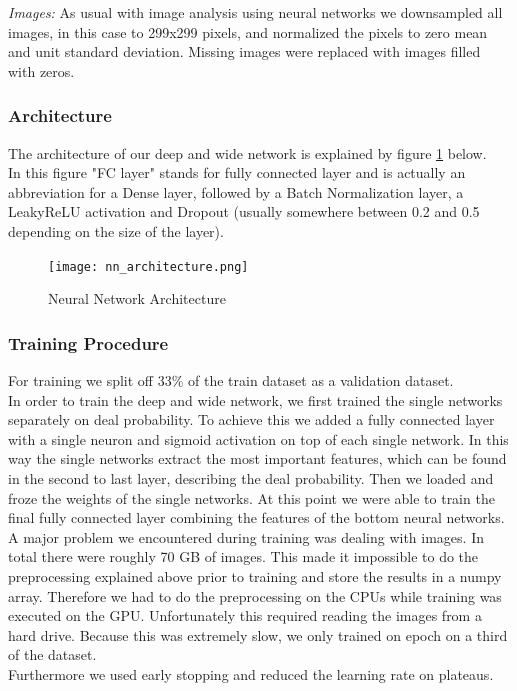 \documentclass[runningheads]{llncs}
\begin{document}
 \textit{Images:} As usual with image analysis using neural networks we downsampled all images, in this case to 299x299 pixels, and normalized the pixels to zero mean and unit standard deviation. Missing images were replaced with images filled with zeros. \\
 
 \subsubsection{Architecture}
The architecture of our deep and wide network is explained by figure \ref{fig:architecture} below.\\
In this figure "FC layer" stands for fully connected layer and is actually an abbreviation for a Dense layer, followed by a Batch Normalization layer, a LeakyReLU activation and Dropout (usually somewhere between 0.2 and 0.5 depending on the size of the layer).
 
\begin{figure}
	\centering
	\texttt{[image: nn\_architecture.png]}
	\caption[]{Neural Network Architecture}
	\label{fig:architecture}
\end{figure}

 \subsubsection{Training Procedure}
 For training we split off 33\% of the train dataset as a validation dataset.\\
In order to train the deep and wide network, we first trained the single networks separately on deal probability. To achieve this we added a fully connected layer with a single neuron and sigmoid activation on top of each single network. In this way the single networks extract the most important features, which can be found in the second to last layer, describing the deal probability. Then we loaded and froze the weights of the single networks. At this point we were able to train the final fully connected layer combining the features of the bottom neural networks.\\
A major problem we encountered during training was dealing with images. In total there were roughly 70 GB of images. This made it impossible to do the preprocessing explained above prior to training and store the results in a numpy array. Therefore we had to do the preprocessing on the CPUs while training was executed on the GPU. Unfortunately this required reading the images from a hard drive. Because this was extremely slow, we only trained on epoch on a third of the dataset.\\
Furthermore we used early stopping and reduced the learning rate on plateaus.
\end{document}
